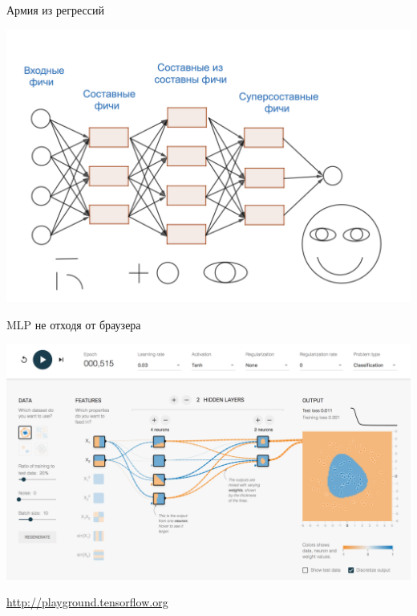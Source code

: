 \documentclass[notes,12pt, aspectratio=169]{beamer}
\begin{document}
\begin{frame}{Армия из регрессий}
	\begin{center}
		\includegraphics[width=0.73\paperwidth]{network_1.png}
	\end{center}
\end{frame}


\begin{frame}{MLP не отходя от браузера}
\begin{center}
	\includegraphics[width=0.76\paperwidth]{tensorflow_demo.png}
\end{center}
\vfill %
\footnotesize 
\color{blue} \url{http://playground.tensorflow.org}
\end{frame}
\end{document}
